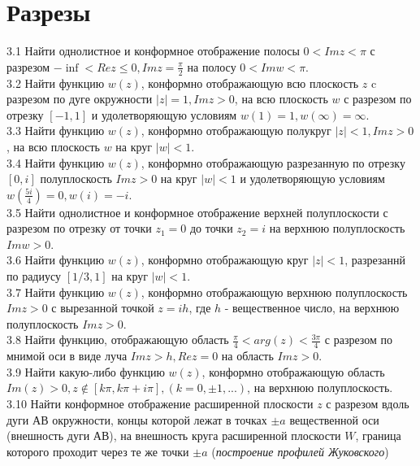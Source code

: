 \documentclass{article}
\begin{document}
\section{Разрезы} 
3.1 Найти однолистное и конформное отображение полосы $0 < Im z < \pi$ с разрезом $-\inf < Re z \leq 0, {Im} z =\frac{\pi}{2}$ на полосу $0 < {Im} w < \pi$.\\
3.2 Найти функцию $w(z)$, конформно отображающую всю плоскость $z$ c разрезом по дуге окружности $\vert z \vert = 1, Im {z}>0$, на всю плоскость $w$ с разрезом по отрезку $[-1, 1]$ и удолетворяющую условиям $w(1)=1, w(\infty)=\infty$.\\
3.3 Найти функцию $w(z)$, конформно отображающую полукруг $\vert z \vert < 1, Im {z}>0$, на всю плоскость $w$ на круг $\vert w \vert < 1$. \\
3.4 Найти функцию $w(z)$, конформно отображающую разрезанную по отрезку $[0, i]$ полуплоскость $Im {z}>0$  на круг $\vert w \vert < 1$ и удолетворяющую условиям $w(\frac{5i}{4})=0, w(i)=-i$.\\
3.5 Найти однолистное и конформное отображение верхней полуплоскости с разрезом по отрезку от точки $z_1 = 0$ до точки $z_2 = i$ на верхнюю полуплоскость $Im w > 0$.\\
3.6 Найти функцию $w(z)$, конформно отображающую круг $\vert z \vert < 1$, разрезаннй по радиусу $[1/3, 1]$ на круг $\vert w \vert < 1$.\\
3.7 Найти функцию $w(z)$, конформно отображающую верхнюю полуплоскость $Im z > 0$ с вырезанной точкой $z=ih$, где $h$ - вещественное число, на верхнюю полуплоскость $Im z > 0$.\\
3.8 Найти функцию, отображающую область $\frac{\pi}{4} < arg(z) < \frac{3\pi}{4}$ с разрезом по мнимой оси в виде луча $Im z>h, Re z = 0$ на область $Im z>0$.\\ 
3.9 Найти какую-либо функцию $w(z)$, конформно отображающую область ${Im(z)>0, z\not\in[k\pi, k\pi+i\pi], (k=0, \pm 1, ...)}$, на верхнюю полуплоскость.\\
3.10 Найти конформное отображение расширенной плоскости $z$ с разрезом вдоль дуги АВ окружности, концы которой лежат в точках $\pm a$ вещественной оси (внешность дуги АВ), на внешность круга расширенной плоскости $W$, граница которого проходит через те же точки $\pm a$ (\emph{построение профилей Жуковского})\\
\end{document}

